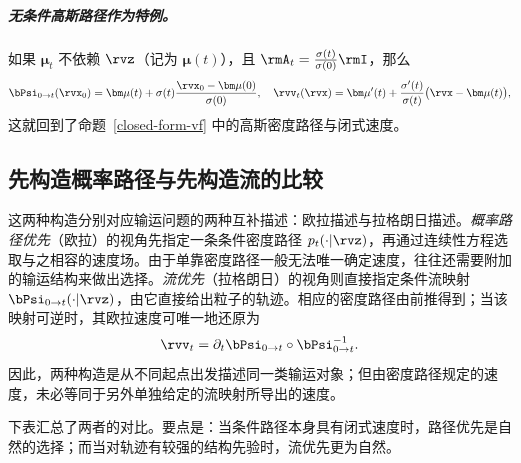 \subparagraph{无条件高斯路径作为特例。}
如果 $\bm{\mu}_t$ 不依赖 $\rvz$（记为 $\bm{\mu}(t)$），且
$\rmA_t = \tfrac{\sigma(t)}{\sigma(0)} \rmI$，那么
\[
\bPsi_{0\to t}(\rvx_0)=\bm\mu(t)+\sigma(t) \frac{\rvx_0-\bm\mu(0)}{\sigma(0)},
\quad
\rvv_t(\rvx)=\bm\mu'(t)+\frac{\sigma'(t)}{\sigma(t)}\bigl(\rvx-\bm\mu(t)\bigr),
\]
这就回到了命题~\ref{closed-form-vf} 中的高斯密度路径与闭式速度。


\subsection{先构造概率路径与先构造流的比较}

这两种构造分别对应输运问题的两种互补描述：欧拉描述与拉格朗日描述。\emph{概率路径优先}（欧拉）的视角先指定一条条件密度路径 $p_t(\cdot|\rvz)$，再通过连续性方程选取与之相容的速度场。由于单靠密度路径一般无法唯一确定速度，往往还需要附加的输运结构来做出选择。\emph{流优先}（拉格朗日）的视角则直接指定条件流映射 $\bPsi_{0\to t}(\cdot|\rvz)$，由它直接给出粒子的轨迹。相应的密度路径由前推得到；当该映射可逆时，其欧拉速度可唯一地还原为
\[
\rvv_t
=
\partial_t\bPsi_{0\to t}
\circ
\bPsi_{0\to t}^{-1}.
\]
因此，两种构造是从不同起点出发描述同一类输运对象；但由密度路径规定的速度，未必等同于另外单独给定的流映射所导出的速度。

下表汇总了两者的对比。要点是：当条件路径本身具有闭式速度时，路径优先是自然的选择；而当对轨迹有较强的结构先验时，流优先更为自然。


